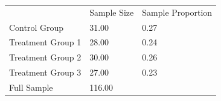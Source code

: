 \documentclass{article}
\begin{document}
\begin{table}[!h]
\centering
\begin{tabular}{lll}
\cline{1-3}
\multicolumn{1}{|l}{} &
  \multicolumn{1}{|l}{Sample Size} &
  \multicolumn{1}{|l|}{Sample Proportion} \\
\cline{1-3}
\multicolumn{1}{|l}{Control Group} &
  \multicolumn{1}{|l}{31.00} &
  \multicolumn{1}{|l|}{0.27} \\
\cline{1-3}
\multicolumn{1}{|l}{Treatment Group 1} &
  \multicolumn{1}{|l}{28.00} &
  \multicolumn{1}{|l|}{0.24} \\
\cline{1-3}
\multicolumn{1}{|l}{Treatment Group 2} &
  \multicolumn{1}{|l}{30.00} &
  \multicolumn{1}{|l|}{0.26} \\
\cline{1-3}
\multicolumn{1}{|l}{Treatment Group 3} &
  \multicolumn{1}{|l}{27.00} &
  \multicolumn{1}{|l|}{0.23} \\
\cline{1-3}
\multicolumn{1}{|l}{Full Sample} &
  \multicolumn{1}{|l}{116.00} &
  \multicolumn{1}{|l|}{} \\
\cline{1-3}
\end{tabular}
\end{table}
\end{document}
